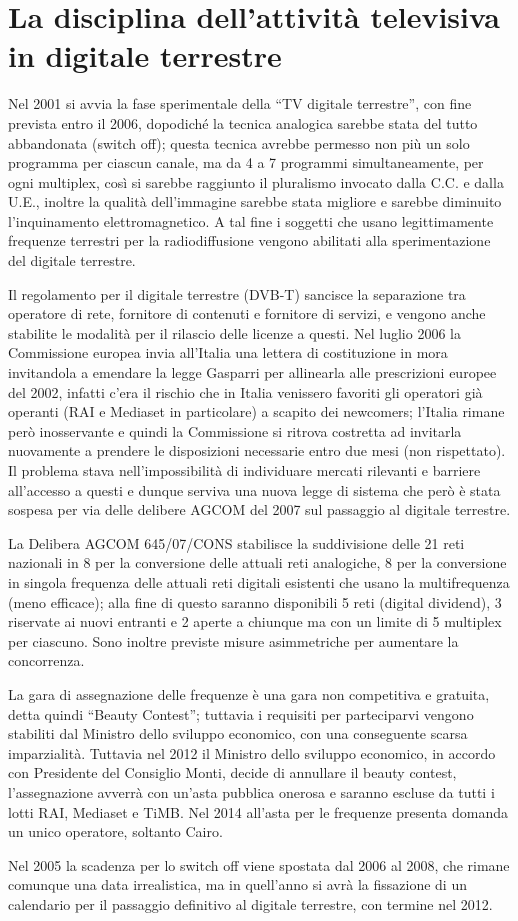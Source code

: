 \section{La disciplina dell’attività televisiva in digitale terrestre}

Nel 2001 si avvia la fase sperimentale della “TV digitale terrestre”, con fine prevista entro il 2006, dopodiché la tecnica analogica sarebbe stata del tutto abbandonata (switch off); questa tecnica avrebbe permesso non più un solo programma per ciascun canale, ma da 4 a 7 programmi simultaneamente, per ogni multiplex, così si sarebbe raggiunto il pluralismo invocato dalla C.C. e dalla U.E., inoltre la qualità dell’immagine sarebbe stata migliore e sarebbe diminuito l’inquinamento elettromagnetico. A tal fine i soggetti che usano legittimamente frequenze terrestri per la radiodiffusione vengono abilitati alla sperimentazione del digitale terrestre.


Il regolamento per il digitale terrestre (DVB-T) sancisce la separazione tra operatore di rete, fornitore di contenuti e fornitore di servizi, e vengono anche stabilite le modalità per il rilascio delle licenze a questi. Nel luglio 2006 la Commissione europea invia all’Italia una lettera di costituzione in mora invitandola a emendare la legge Gasparri per allinearla alle prescrizioni europee del 2002, infatti c’era il rischio che in Italia venissero favoriti gli operatori già operanti (RAI e Mediaset in particolare) a scapito dei newcomers; l’Italia rimane però inosservante e quindi la Commissione si ritrova costretta ad invitarla nuovamente a prendere le disposizioni necessarie entro due mesi (non rispettato). Il problema stava nell’impossibilità di individuare mercati rilevanti e barriere all’accesso a questi e dunque serviva una nuova legge di sistema che però è stata sospesa per via delle delibere AGCOM del 2007 sul passaggio al digitale terrestre.


La Delibera AGCOM 645/07/CONS stabilisce la suddivisione delle 21 reti nazionali in 8 per la conversione delle attuali reti analogiche, 8 per la conversione in singola frequenza delle attuali reti digitali esistenti che usano la multifrequenza (meno efficace); alla fine di questo saranno disponibili 5 reti (digital dividend), 3 riservate ai nuovi entranti e 2 aperte a chiunque ma con un limite di 5 multiplex per ciascuno. Sono inoltre previste misure asimmetriche per aumentare la concorrenza. 


La gara di assegnazione delle frequenze è una gara non competitiva e gratuita, detta quindi “Beauty Contest”; tuttavia i requisiti per parteciparvi vengono stabiliti dal Ministro dello sviluppo economico, con una conseguente scarsa imparzialità. Tuttavia nel 2012 il Ministro dello sviluppo economico, in accordo con Presidente del Consiglio Monti, decide di annullare il beauty contest, l’assegnazione avverrà con un’asta pubblica onerosa e saranno escluse da tutti i lotti RAI, Mediaset e TiMB. Nel 2014 all’asta per le frequenze presenta domanda un unico operatore, soltanto Cairo.


Nel 2005 la scadenza per lo switch off viene spostata dal 2006 al 2008, che rimane comunque una data irrealistica, ma in quell’anno si avrà la fissazione di un calendario per il passaggio definitivo al digitale terrestre, con termine nel 2012.